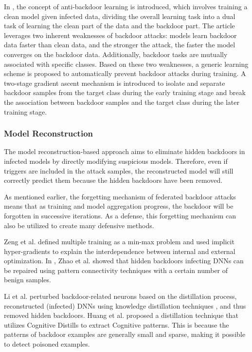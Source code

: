 \documentclass[conference]{IEEEtran}
\begin{document}
In \cite{b98}, the concept of anti-backdoor learning is introduced, which involves training a clean model given infected data,
dividing the overall learning task into a dual task of learning the clean part of the data and the backdoor part.
The article leverages two inherent weaknesses of backdoor attacks: models learn backdoor data faster than clean data,
and the stronger the attack, the faster the model converges on the backdoor data. Additionally, backdoor tasks are mutually
associated with specific classes. Based on these two weaknesses, a generic learning scheme is proposed to automatically prevent
backdoor attacks during training. A two-stage gradient ascent mechanism is introduced to isolate and separate backdoor samples
from the target class during the early training stage and break the association between backdoor samples and the target class during the later training stage.
\subsubsection{Model Reconstruction}
The model reconstruction-based approach aims to eliminate hidden backdoors in infected models by directly modifying suspicious models.
Therefore, even if triggers are included in the attack samples, the reconstructed model will still correctly predict them because
the hidden backdoors have been removed.

As mentioned earlier, the forgetting mechanism of federated backdoor attacks means that as training and model aggregation progress,
the backdoor will be forgotten in successive iterations. As a defense, this forgetting mechanism can also be utilized to create many defensive methods.

Zeng et al. \cite{b90}defined multiple training as a min-max problem and used implicit hyper-gradients to
explain the interdependence between internal and external optimization.
In \cite{b91}, Zhao et al. showed that hidden backdoors infecting DNNs can be repaired using pattern connectivity techniques with a certain number of benign samples.

Li et al. \cite{b92} perturbed backdoor-related neurons based on the distillation process, reconstructed (infected) DNNs using knowledge
distillation techniques , and thus removed hidden backdoors.
Huang et al. \cite{b109} proposed a distillation technique that utilizes Cognitive Distills to extract Cognitive patterns.
This is because the patterns of backdoor examples are generally small and sparse, making it possible to detect poisoned examples.
\end{document}
